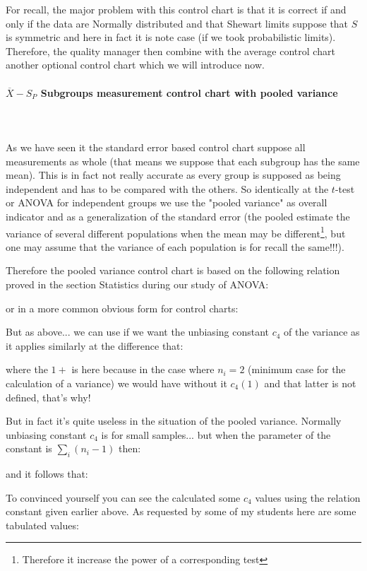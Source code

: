 	For recall, the major problem with this control chart is that it is correct if and only if the data are Normally distributed and that Shewart limits suppose that $S$ is symmetric and here in fact it is note case (if we took probabilistic limits). Therefore, the quality manager then combine with the average control chart another optional control chart which we will introduce now.
	
	\paragraph{$\overline{X}-S_P$ Subgroups measurement control chart with pooled variance}\mbox{}\\\\
	As we have seen it the standard error based control chart suppose all measurements as whole (that means we suppose that each subgroup has the same mean). This is in fact not really accurate as every group is supposed as being independent and has to be compared with the others. So  identically at the $t$-test or ANOVA for independent groups we use the "pooled variance" as overall indicator and as a generalization of the standard error (the pooled estimate the variance of several different populations when the mean may be different\footnote{Therefore it increase the power of a corresponding test}, but one may assume that the variance of each population is for recall the same!!!).
	
	Therefore the pooled variance control chart is based on the following relation proved in the section Statistics during our study of ANOVA:
	
	or in a more common obvious form for control charts:
	
	But as above... we can use if we want the unbiasing constant $c_4$ of the variance as it applies similarly at the difference that:
	
	where the $1+$ is here because in the case where $n_i=2$ (minimum case for the calculation of a variance) we would have without it $c_4(1)$ and that latter is not defined, that's why!
	
	But in fact it's quite useless in the situation of the pooled variance. Normally unbiasing constant $c_4$ is for small samples... but when the parameter of the constant is $\sum_{i}(n_i-1)$ then:
	
	and it follows that:
	
	To convinced yourself you can see the calculated some $c_4$ values using the relation constant given earlier above. As requested by some of my students here are some tabulated values:
		
